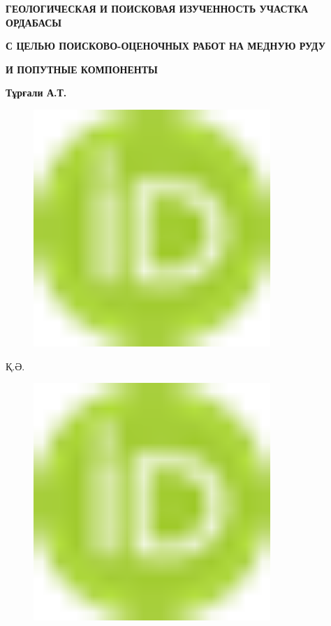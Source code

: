 
{\bfseries ГЕОЛОГИЧЕСКАЯ И ПОИСКОВАЯ ИЗУЧЕННОСТЬ УЧАСТКА ОРДАБАСЫ}

{\bfseries С ЦЕЛЬЮ ПОИСКОВО-ОЦЕНОЧНЫХ РАБОТ НА МЕДНУЮ РУДУ}

{\bfseries И ПОПУТНЫЕ КОМПОНЕНТЫ}

{\bfseries Тұрғали А.Т.}
\begin{figure}[H]
	\centering
	\includegraphics[width=0.8\textwidth]{media/gorn2/image1}
	\caption*{}
\end{figure}

Қ.Ә.
\begin{figure}[H]
	\centering
	\includegraphics[width=0.8\textwidth]{media/gorn2/image1}
	\caption*{}
\end{figure}

